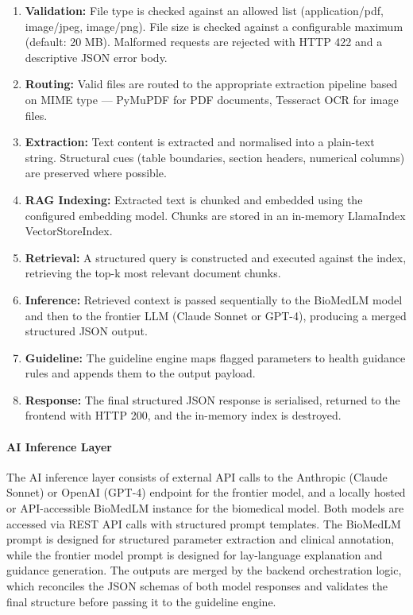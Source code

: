 \documentclass[12pt,a4paper]{report}
\begin{document}
\begin{enumerate}
    \item \textbf{Validation:} File type is checked against an allowed list (application/pdf, image/jpeg, image/png). File size is checked against a configurable maximum (default: 20 MB). Malformed requests are rejected with HTTP 422 and a descriptive JSON error body.
    \item \textbf{Routing:} Valid files are routed to the appropriate extraction pipeline based on MIME type --- PyMuPDF for PDF documents, Tesseract OCR for image files.
    \item \textbf{Extraction:} Text content is extracted and normalised into a plain-text string. Structural cues (table boundaries, section headers, numerical columns) are preserved where possible.
    \item \textbf{RAG Indexing:} Extracted text is chunked and embedded using the configured embedding model. Chunks are stored in an in-memory LlamaIndex VectorStoreIndex.
    \item \textbf{Retrieval:} A structured query is constructed and executed against the index, retrieving the top-k most relevant document chunks.
    \item \textbf{Inference:} Retrieved context is passed sequentially to the BioMedLM model and then to the frontier LLM (Claude Sonnet or GPT-4), producing a merged structured JSON output.
    \item \textbf{Guideline:} The guideline engine maps flagged parameters to health guidance rules and appends them to the output payload.
    \item \textbf{Response:} The final structured JSON response is serialised, returned to the frontend with HTTP 200, and the in-memory index is destroyed.
\end{enumerate}

\paragraph{AI Inference Layer}
The AI inference layer consists of external API calls to the Anthropic (Claude Sonnet) or OpenAI (GPT-4) endpoint for the frontier model, and a locally hosted or API-accessible BioMedLM instance for the biomedical model. Both models are accessed via REST API calls with structured prompt templates. The BioMedLM prompt is designed for structured parameter extraction and clinical annotation, while the frontier model prompt is designed for lay-language explanation and guidance generation. The outputs are merged by the backend orchestration logic, which reconciles the JSON schemas of both model responses and validates the final structure before passing it to the guideline engine.
\end{document}
